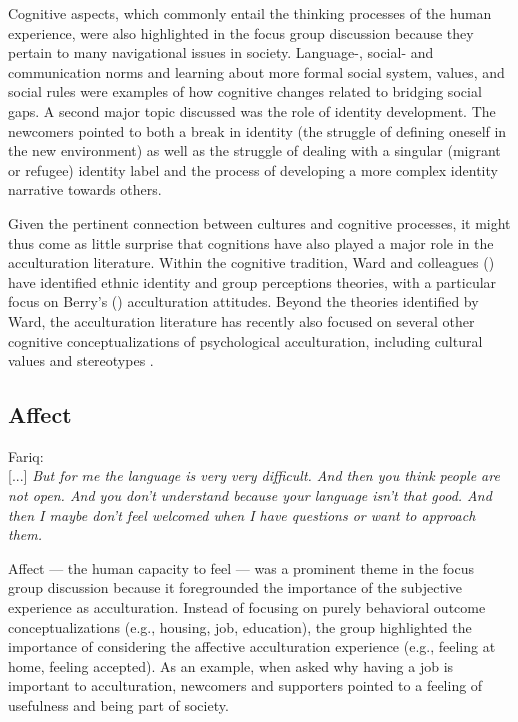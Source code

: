 \documentclass[man, 12pt, a4paper]{apa7}
\begin{document}
Cognitive aspects, which commonly entail the thinking processes of the human experience, were also highlighted in the focus group discussion because they pertain to many navigational issues in society. Language-, social- and communication norms and learning about more formal social system, values, and social rules were examples of how cognitive changes related to bridging social gaps. A second major topic discussed was the role of identity development. The newcomers pointed to both a break in identity (the struggle of defining oneself in the new environment) as well as the struggle of dealing with a singular (migrant or refugee) identity label and the process of developing a more complex identity narrative towards others.

Given the pertinent connection between cultures and cognitive processes, it might thus come as little surprise that cognitions have also played a major role in the acculturation literature. Within the cognitive tradition, Ward and colleagues (\citeyear{Ward2001, Ward2019}) have identified ethnic identity and group perceptions theories, with a particular focus on Berry's (\citeyear{Berry1997b}) acculturation attitudes. Beyond the theories identified by Ward, the acculturation literature has recently also focused on several other cognitive conceptualizations of psychological acculturation, including cultural values \citep[e.g.,][]{Marin2003} and stereotypes \citep[e.g.,][]{Stanciu2018}. 

\subsection{Affect}
\begin{displayquote}
    Fariq:\\
    {[...]} \textit{But for me the language is very very difficult. And then you think people are not open. And you don't understand because your language isn't that good. And then I maybe don't feel welcomed when I have questions or want to approach them.}
\end{displayquote}

Affect --- the human capacity to feel \citep[including emotions and moods;][]{FeldmanBarrett2007} --- was a prominent theme in the focus group discussion because it foregrounded the importance of the subjective experience as acculturation. Instead of focusing on purely behavioral outcome conceptualizations (e.g., housing, job, education), the group highlighted the importance of considering the affective acculturation experience (e.g., feeling at home, feeling accepted). As an example, when asked why having a job is important to acculturation, newcomers and supporters pointed to a feeling of usefulness and being part of society. 
\end{document}
